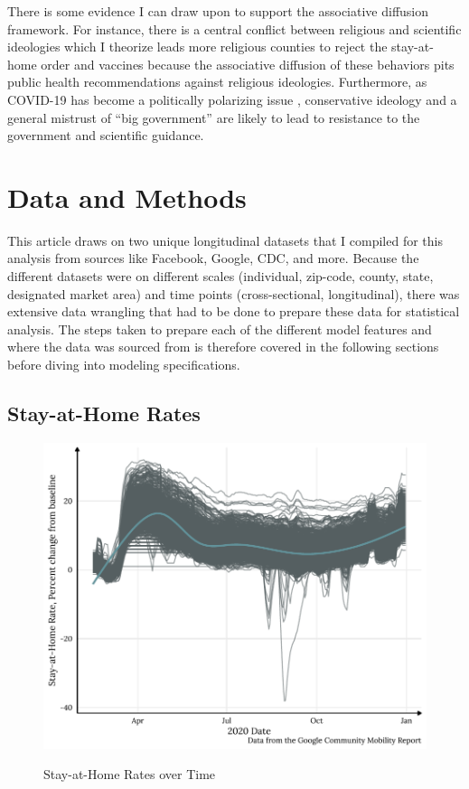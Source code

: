 There is some evidence I can draw upon to support the associative diffusion
framework. For instance, there is a central conflict between religious and
scientific ideologies which I theorize leads more religious counties to reject
the stay-at-home order and vaccines
\citep{evansReligionScienceEpistemological2008} because the associative
diffusion of these behaviors pits public health recommendations against
religious ideologies. Furthermore, as COVID-19 has become a politically
polarizing issue \citep{ternullo22}, conservative ideology and a general
mistrust of ``big government'' \citep{frank2007, gauchat2008} are likely to lead
to resistance to the government and scientific guidance.

\hypertarget{data-and-methods}{\section{Data and Methods}\label{data-and-methods}}

This article draws on two unique longitudinal datasets that I compiled for this
analysis from sources like Facebook, Google, CDC, and more. Because the
different datasets were on different scales (individual, zip-code, county,
state, designated market area) and time points (cross-sectional, longitudinal),
there was extensive data wrangling that had to be done to prepare these data for
statistical analysis. The steps taken to prepare each of the different model
features and where the data was sourced from is therefore covered in the
following sections before diving into modeling specifications.

\hypertarget{stay-at-home-rates}{\subsection{Stay-at-Home Rates}\label{stay-at-home-rates}}



\begin{figure}
{\centering \includegraphics[width=0.8\linewidth]{figs/paper3/plot-google-1}}
\caption{Stay-at-Home Rates over Time}\label{fig:plot-google}
\end{figure}


